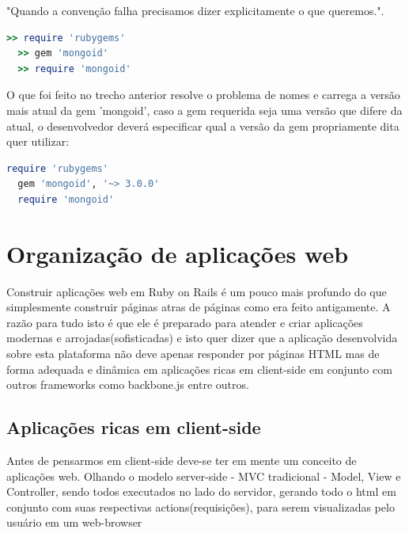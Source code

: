 "Quando a convenção falha precisamos dizer explicitamente o que queremos."\cite{AKITA}.

{\singlespace
\begin{lstlisting}[caption=Exemplo de versionamento de gems,language=Ruby,label={versionamento}]
  >> require 'rubygems'
  >> gem 'mongoid'
  >> require 'mongoid'
\end{lstlisting}
}

O que foi feito no trecho anterior resolve o problema de nomes e carrega a versão mais atual da gem 'mongoid', caso a gem requerida seja 
uma versão que difere da atual, o desenvolvedor deverá especificar qual a versão da gem propriamente dita quer utilizar:


{\singlespace
\begin{lstlisting}[caption=Exemplo de versionamento de gems,language=Ruby,label={versionamento}]
  require 'rubygems'
  gem 'mongoid', '~> 3.0.0'
  require 'mongoid'
\end{lstlisting}
}

\section{Organização de aplicações web}

Construir aplicações web em Ruby on Rails é um pouco mais profundo do que simplesmente construir páginas atras de páginas como era feito antigamente.
A razão para tudo isto é que ele é preparado para atender e criar aplicações modernas e arrojadas(sofisticadas) e isto quer dizer que a aplicação desenvolvida
sobre esta plataforma não deve apenas responder por páginas HTML mas de forma adequada e dinâmica em aplicações ricas em client-side em conjunto com outros 
frameworks como backbone.js entre outros.

\subsection{Aplicações ricas em client-side}
Antes de pensarmos em client-side deve-se ter em mente um conceito de aplicações web. Olhando o modelo server-side - MVC tradicional - Model, View e Controller, 
sendo todos executados no lado do servidor, gerando todo o html em conjunto com suas respectivas actions(requisições), para serem visualizadas pelo usuário em um web-browser


